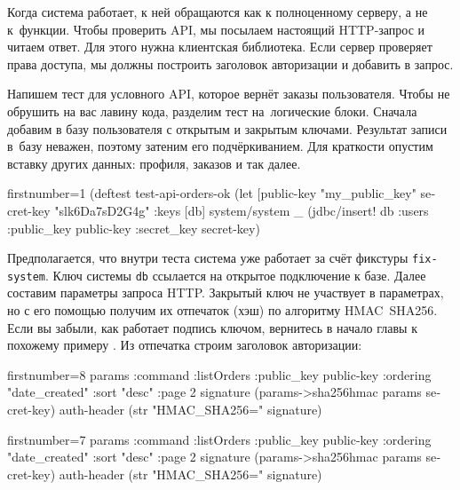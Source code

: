 Когда система работает, к ней обращаются как к полноценному серверу, а не к~функции.
Чтобы проверить API, мы посылаем настоящий HTTP-запрос и читаем
ответ. Для этого нужна клиентская библиотека. Если сервер проверяет права
доступа, мы должны построить заголовок авторизации и добавить в запрос.

Напишем тест для условного API, которое вернёт заказы пользователя. Чтобы не
обрушить на вас лавину кода, разделим тест на~логические блоки. Сначала добавим
в базу пользователя с открытым и закрытым ключами. Результат записи в~базу
неважен, поэтому затеним его подчёркиванием. Для краткости опустим вставку
других данных: профиля, заказов и так далее.

\begin{english}
  \begin{clojure/lines*}{firstnumber=1}
(deftest test-api-orders-ok
  (let [public-key "my_public_key"
        secret-key "slk6Da7sD2G4g"
        {:keys [db]} system/system
        _ (jdbc/insert! db :users
              {:public_key public-key
               :secret_key secret-key})
  \end{clojure/lines*}
\end{english}

Предполагается, что внутри теста система уже работает за счёт фикстуры
\verb|fix-system|. Ключ системы \verb|db| ссылается на открытое подключение к
базе. Далее составим параметры запроса HTTP. Закрытый ключ не участвует в
параметрах, но с его помощью получим их отпечаток (хэш) по алгоритму
HMAC~SHA256. Если вы забыли, как работает подпись ключом, вернитесь в начало
главы к похожему примеру . Из отпечатка строим заголовок
авторизации:

\ifnarrow

\begin{english}
  \begin{clojure/lines*}{firstnumber=8}
    params {:command :listOrders
            :public_key public-key
            :ordering "date_created"
            :sort "desc"
            :page 2}
    signature (params->sha256hmac
                params secret-key)
    auth-header (str "HMAC_SHA256="
                  signature)
  \end{clojure/lines*}
\end{english}

\else

\begin{english}
  \begin{clojure/lines*}{firstnumber=7}
        params {:command :listOrders
                :public_key public-key
                :ordering "date_created"
                :sort "desc"
                :page 2}
        signature (params->sha256hmac params secret-key)
        auth-header (str "HMAC_SHA256=" signature)
  \end{clojure/lines*}
\end{english}

